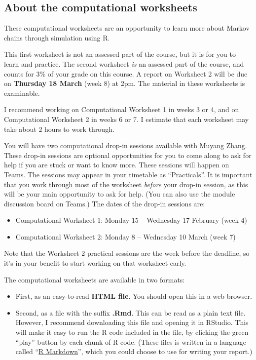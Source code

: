 \documentclass[
  a4paper,
]{article}
\providecommand{\tightlist}{%
  \setlength{\itemsep}{0pt}\setlength{\parskip}{0pt}}
\theoremstyle{definition}
\theoremstyle{definition}
\theoremstyle{definition}
\theoremstyle{remark}
\begin{document}
\hypertarget{C-about}{%
\subsection*{About the computational worksheets}\label{C-about}}

These computational worksheets are an opportunity to learn more about Markov chains through simulation using R.

This first worksheet is not an assessed part of the course, but it is for you to learn and practice. The second worksheet \emph{is} an assessed part of the course, and counts for 3\% of your grade on this course. A report on Worksheet 2 will be due on \textbf{Thursday 18 March} (week 8) at 2pm. The material in these worksheets is examinable.

I recommend working on Computational Worksheet 1 in weeks 3 or 4, and on Computational Worksheet 2 in weeks 6 or 7. I estimate that each worksheet may take about 2 hours to work through.

You will have two computational drop-in sessions available with Muyang Zhang. These drop-in sessions are optional opportunities for you to come along to ask for help if you are stuck or want to know more. These sessions will happen on Teams. The sessions may appear in your timetable as ``Practicals''. It is important that you work through most of the worksheet \emph{before} your drop-in session, as this will be your main opportunity to ask for help. (You can also use the module discussion board on Teams.) The dates of the drop-in sessions are:

\begin{itemize}
\tightlist
\item
  Computational Worksheet 1: Monday 15 -- Wednesday 17 February (week 4)
\item
  Computational Worksheet 2: Monday 8 -- Wednesday 10 March (week 7)
\end{itemize}

Note that the Worksheet 2 practical sessions are the week before the deadline, so it's in your benefit to start working on that worksheet early.

The computational worksheets are available in two formats:

\begin{itemize}
\tightlist
\item
  First, as an easy-to-read \textbf{HTML file}. You should open this in a web browser.
\item
  Second, as a file with the suffix \textbf{.Rmd}. This can be read as a plain text file. However, I recommend downloading this file and opening it in RStudio. This will make it easy to run the R code included in the file, by clicking the green ``play'' button by each chunk of R code. (These files is written in a language called ``\href{https://www.stat.cmu.edu/~cshalizi/rmarkdown/}{R Markdown}'', which you could choose to use for writing your report.)
\end{itemize}
\end{document}
